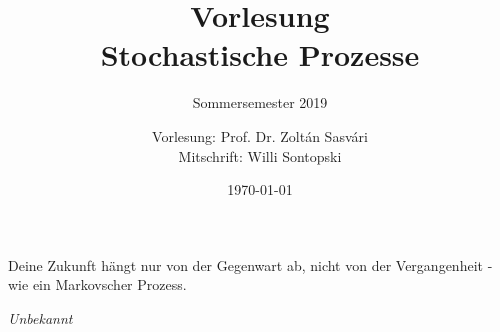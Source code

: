 \documentclass[]{scrreprt}
\title{
	Vorlesung\\
	Stochastische Prozesse\\
}
\subtitle{Sommersemester 2019}
\author{
	Vorlesung:  Prof. Dr. Zoltán Sasvári\\
	Mitschrift: Willi Sontopski
}
\date{\today}
\begin{document}
	\makeatletter
  	\renewcommand{\@pnumwidth}{2em}
  	\makeatother
  	
  	
	\maketitle
	\epigraph{Deine Zukunft hängt nur von der Gegenwart ab, nicht von der Vergangenheit - wie ein Markovscher Prozess.}{\textit{Unbekannt}}
	\newpage
	\doclicenseThis
	\tableofcontents
	
	
	
	
	
	\appendix
	
	\newcommand{\pathPrefix}{Loesungen/}

	\printindex %
	\nocite{*} %
	
\end{document}
